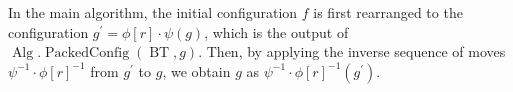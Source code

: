 \documentclass[letter,11pt]{article}
\theoremstyle{definition}
\theoremstyle{definition}
\newtheorem{alg}{Algorithm}
\DeclareMathOperator{\BT}{BT}
\DeclareMathOperator{\Alg}{Alg}
\DeclareMathOperator{\JoiV}{JointVertex}
\DeclareMathOperator{\PacCon}{PackedConfig}
\DeclareMathOperator{\Pac}{Packing}
\newcommand{\1}{\boldmath$~1~$\unboldmath}
\newcommand{\tume}{\hspace*{0.2em}}
\newcommand{\maru}[1]{{\ooalign{\hfill$\small#1$\hfill\crcr\scalebox{1.3}{$\bigcirc$}}}}
\newenvironment{alg-enumerate}{%
  \begin{enumerate}%
   \renewcommand{\theenumi}{\arabic{enumi}}%
   \renewcommand{\labelenumi}{\rm{{\maru{\theenumi}}\tume\/}}%
   \renewcommand{\labelenumii}{\rm{$(${\maru{\theenumi}}-\theenumii$)$\tume\/}}%
 }{\end{enumerate}%
}
\newcommand{\namelistlabel}[1]{\hspace*{10pt}\mbox{#1}:\hspace{\fill}}
\newenvironment{namelist}[1]{%
    \begin{list}{}
      {\let\makelabel\namelistlabel
      \settowidth{\labelwidth}{#1}
      \setlength{\leftmargin}{1.1\labelwidth}
      \setlength{\labelsep}{5pt}
      \setlength{\parsep}{0pt}}
  }{%
  \end{list}}
\begin{document}
\noindent
In the main algorithm, the initial configuration $f$ is first rearranged to the configuration 
$g^{\prime} = \phi[r] \cdot \psi(g)$, which is the output of $\Alg.\PacCon(\BT, g)$.  
Then, by applying the inverse sequence of moves $\psi^{-1}\cdot\phi[r]^{-1}$ from $g^{\prime}$ to $g$, 
we obtain $g$ as $\psi^{-1} \cdot \phi[r]^{-1}(g^{\prime})$. 
\end{document}
